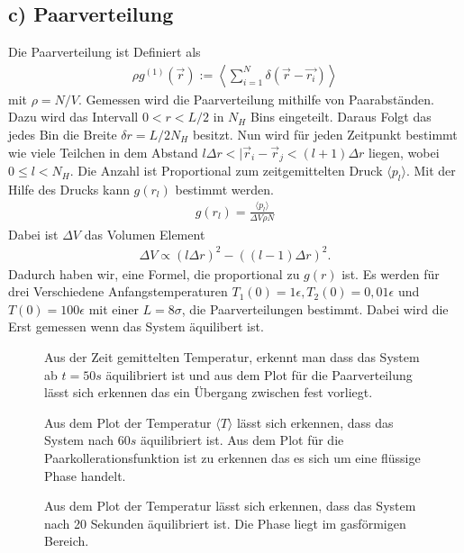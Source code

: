\subsection*{c) Paarverteilung}
Die Paarverteilung ist Definiert als
\begin{align*}
	\rho g^{(1)}(\vec{r}):=\left< \sum\limits_{i=1}^{N}\delta(\vec{r}-\vec{r_i})\right>
\end{align*}
mit $\rho=N/V$.
Gemessen wird die Paarverteilung mithilfe von Paarabständen.
Dazu wird das Intervall $0<r<L/2$ in $N_H$ Bins eingeteilt.
Daraus Folgt das jedes Bin die Breite $\delta r= L/2N_H$ besitzt.
Nun wird für jeden Zeitpunkt bestimmt wie viele Teilchen in dem Abstand $l\Delta r < |\vec{r}_i-\vec{r}_j<(l+1)\Delta r$ liegen, wobei $0\le l < N_H$.
Die Anzahl ist Proportional zum zeitgemittelten Druck $\langle p_l \rangle$.
Mit der Hilfe des Drucks kann $g(r_l)$ bestimmt werden.
\begin{align}
	g(r_l)=\frac{\langle p_l\rangle}{\Delta V\rho N}
\end{align}
Dabei ist $\Delta V$ das Volumen Element
\begin{align*}
	\Delta V \propto (l\Delta r)^2-((l-1)\Delta r)^2.
\end{align*}
Dadurch haben wir, eine Formel, die proportional zu $g(r)$ ist.
Es werden für drei Verschiedene Anfangstemperaturen $T_1(0)=1\epsilon,T_2(0)=0,01\epsilon$ und $T(0)=100\epsilon$ mit einer $L=8\sigma$, die Paarverteilungen bestimmt.
Dabei wird die Erst gemessen wenn das System äquilibert ist.
\begin{figure}[h!]
	\centering
	\caption{Aus der Zeit gemittelten Temperatur, erkennt man dass das System ab $t=50s$ äquilibriert ist und aus dem Plot für die Paarverteilung lässt sich erkennen das ein Übergang zwischen fest vorliegt.}
\end{figure}
\begin{figure}[h!]
	\centering
	\caption{Aus dem Plot der Temperatur $\langle T\rangle$ lässt sich erkennen, dass das System nach $60s$ äquilibriert ist. Aus dem Plot für die Paarkollerationsfunktion ist zu erkennen das es sich um eine flüssige Phase handelt.}
\end{figure}
\begin{figure}[h!]
	\centering
	\caption{Aus dem Plot der Temperatur lässt sich erkennen, dass das System nach 20 Sekunden äquilibriert ist. Die Phase liegt im gasförmigen Bereich.}
\end{figure}\newpage

